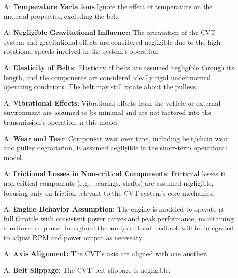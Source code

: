 \documentclass[12pt]{article}
\newcounter{assumpnum} %
\begin{document}
\begin{itemize}

\item[A\refstepcounter{assumpnum}\theassumpnum \label{A_1}:]
\textbf{Temperature Variations} Ignore the effect of temperature on the material properties, excluding the belt.

\item[A\refstepcounter{assumpnum}\theassumpnum \label{A_2}:]
\textbf{Negligible Gravitational Influence}: The orientation of the CVT system and gravitational effects are considered negligible due to the high rotational speeds involved in the system's operation.

\item[A\refstepcounter{assumpnum}\theassumpnum \label{A_3}:]
\textbf{Elasticity of Belts}: Elasticity of belts are assumed negligible through its length, and the components are considered ideally rigid under normal operating conditions. The belt may still rotate about the pulleys.

\item[A\refstepcounter{assumpnum}\theassumpnum \label{A_4}:]
\textbf{Vibrational Effects}: Vibrational effects from the vehicle or external environment are assumed to be minimal and are not factored into the transmission’s operation in this model.

\item[A\refstepcounter{assumpnum}\theassumpnum \label{A_5}:]
\textbf{Wear and Tear}: Component wear over time, including belt/chain wear and pulley degradation, is assumed negligible in the short-term operational model.

\item[A\refstepcounter{assumpnum}\theassumpnum \label{A_6}:]
\textbf{Frictional Losses in Non-critical Components}: Frictional losses in non-critical components (e.g., bearings, shafts) are assumed negligible, focusing only on friction relevant to the CVT system's core mechanics.

\item[A\refstepcounter{assumpnum}\theassumpnum \label{A_7}:]
\textbf{Engine Behavior Assumption:} The engine is modeled to operate at full throttle with consistent power curves and peak performance, maintaining a uniform response throughout the analysis. Load feedback will be integrated to adjust RPM and power output as necessary.

\item[A\refstepcounter{assumpnum}\theassumpnum \label{A_8}:]
\textbf{Axis Alignment:} The CVT's axis are aligned with one another.

\item[A\refstepcounter{assumpnum}\theassumpnum \label{A_8}:]
\textbf{Belt Slippage:} The CVT belt slippage is negligible.


\end{itemize}
\end{document}
